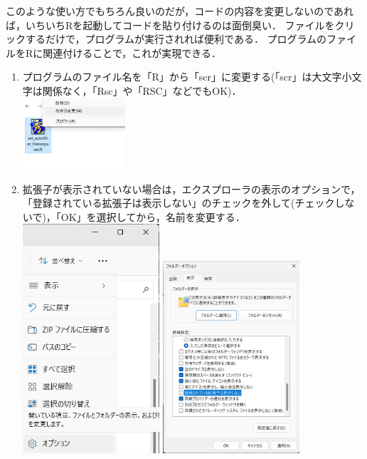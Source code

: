 \documentclass[
]{article}
\providecommand{\tightlist}{%
  \setlength{\itemsep}{0pt}\setlength{\parskip}{0pt}}
\begin{document}
このような使い方でもちろん良いのだが，コードの内容を変更しないのであれば，いちいちRを起動してコードを貼り付けるのは面倒臭い．
ファイルをクリックするだけで，プログラムが実行されれば便利である．
プログラムのファイルをRに関連付けることで，これが実現できる．

\begin{enumerate}
\def\labelenumi{\arabic{enumi}.}
\tightlist
\item
  プログラムのファイル名を「R」から「scr」に変更する(「scr」は大文字小文字は関係なく，「Rsc」や「RSC」などでもOK)．\\
  \includegraphics[width=0.3\textwidth,height=\textheight]{img/assoc_01.png}
\item
  拡張子が表示されていない場合は，エクスプローラの表示のオプションで，「登録されている拡張子は表示しない」のチェックを外して(チェックしないで)，「OK」を選択してから，名前を変更する．\\
  \includegraphics[width=0.4\textwidth,height=\textheight]{img/assoc_00_01.png}
  \includegraphics[width=0.4\textwidth,height=\textheight]{img/assoc_00_02.png}

\end{enumerate}
\end{document}
